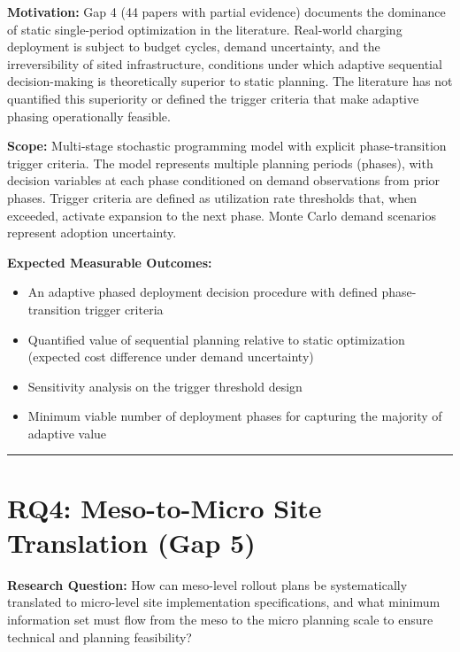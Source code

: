 \documentclass[letterpaper, 12pt, oneside, doublespacing]{Thesis}
\begin{document}
\noindent \textbf{Motivation:} Gap 4 (44 papers with partial evidence) documents the dominance of static single-period optimization in the literature. Real-world charging deployment is subject to budget cycles, demand uncertainty, and the irreversibility of sited infrastructure, conditions under which adaptive sequential decision-making is theoretically superior to static planning. The literature has not quantified this superiority or defined the trigger criteria that make adaptive phasing operationally feasible.



\noindent \textbf{Scope:} Multi-stage stochastic programming model with explicit phase-transition trigger criteria. The model represents multiple planning periods (phases), with decision variables at each phase conditioned on demand observations from prior phases. Trigger criteria are defined as utilization rate thresholds that, when exceeded, activate expansion to the next phase. Monte Carlo demand scenarios represent adoption uncertainty.



\noindent \textbf{Expected Measurable Outcomes:}

\begin{itemize}
  \item An adaptive phased deployment decision procedure with defined phase-transition trigger criteria
  \item Quantified value of sequential planning relative to static optimization (expected cost difference under demand uncertainty)
  \item Sensitivity analysis on the trigger threshold design
  \item Minimum viable number of deployment phases for capturing the majority of adaptive value
\end{itemize}


\bigskip\noindent\rule{\linewidth}{0.4pt}\bigskip


\section{RQ4: Meso-to-Micro Site Translation (Gap 5)}


\noindent \textbf{Research Question:} How can meso-level rollout plans be systematically translated to micro-level site implementation specifications, and what minimum information set must flow from the meso to the micro planning scale to ensure technical and planning feasibility?
\end{document}
